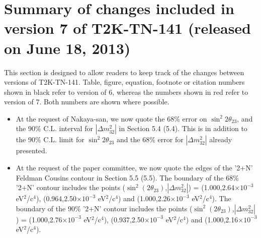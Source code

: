 
\section{Summary of changes included in version 7 of T2K-TN-141 (released on June 18, 2013)}

This section is designed to allow readers to keep track of the changes between versions of T2K-TN-141.
Table, figure, equation, footnote or citation numbers shown in black refer to version of 6,
{\color{red}whereas the numbers shown in red refer to version of 7}.
Both numbers are shown where possible.

\begin{itemize}

\item
  At the request of Nakaya-san, we now quote the
  68\% error on $\sin^2 2\theta_{23}$, and the 90\% C.L. interval for
  $|\Delta m^2_{32}|$ in Section 5.4 {\color{red}(5.4)}.
  This is in addition to the 90\% C.L. limit for $\sin^2 2\theta_{23}$ and
  the 68\% error for $|\Delta m^2_{32}|$ already presented.

\item
  At the request of the paper committee, we now quote the edges
  of the '2+N' Feldman Cousins contour in Section 5.5 {\color{red}(5.5)}.
  The boundary of the 68\% '2+N' contour includes the points
  ($\sin^2(2\theta_{23})$,$|\Delta m^2_{32}|$) =
  (1.000,2.64$\times10^{-3}$ eV$^2$/c$^4$),
  (0.964,2.50$\times10^{-3}$ eV$^2$/c$^4$) and
  (1.000,2.26$\times10^{-3}$ eV$^2$/c$^4$).
  The boundary of the 90\% '2+N' contour includes the points
  ($\sin^2(2\theta_{23})$,$|\Delta m^2_{32}|$) =
  (1.000,2.76$\times10^{-3}$ eV$^2$/c$^4$),
  (0.937,2.50$\times10^{-3}$ eV$^2$/c$^4$) and
  (1.000,2.16$\times10^{-3}$ eV$^2$/c$^4$).

\end{itemize}





